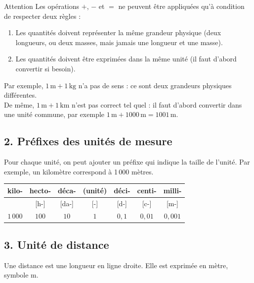 \vfill
\begin{astuce}{Attention}
Les opérations $+$, $-$ et $=$ ne peuvent être appliquées qu'à condition de respecter deux règles :

\vspace{10pt}
\begin{enumerate}
    \item Les quantités doivent représenter la \textcolor{themeColor}{même grandeur physique} (deux longueurs, ou deux masses, mais jamais une longueur et une masse).
    \item Les quantités doivent être exprimées dans la \textcolor{themeColor}{même unité} (il faut d'abord convertir si besoin).
\end{enumerate}

\vspace{10pt}
Par exemple, $1\,\text{m} + 1\,\text{kg}$ n'a pas de sens : ce sont deux grandeurs physiques différentes.\\[7pt]
De même, $1\,\text{m} + 1\,\text{km}$ n'est pas correct tel quel : il faut d'abord convertir dans une unité commune, par exemple $1\,\text{m} + 1000\,\text{m} = 1001\,\text{m}$.
\end{astuce}

\newpage
\subsection*{2. Préfixes des unités de mesure}

Pour chaque unité, on peut ajouter un préfixe qui indique la taille de l'unité. Par exemple, un kilomètre correspond à 1\,000 mètres.

\vspace{10pt}
{\footnotesize
\def\arraystretch{2}
\begin{tabularx}{\linewidth}{|*{7}{C|}}
\hline
{}kilo- & hecto- & déca- & (unité) & déci- & centi- & milli- \\\hline
[k-] & [h-] & [da-] & [-] & [d-] & [c-] & [m-] \\\hline
$1\,000$ & $100$ & $10$ & $1$ & $0,1$ & $0,01$ & $0,001$ \\\hline
\end{tabularx}
\def\arraystretch{1}}

\vfill
\subsection*{3. Unité de distance}

Une distance est une longueur en ligne droite. Elle est exprimée en \textcolor{themeColor}{mètre, symbole m}.

